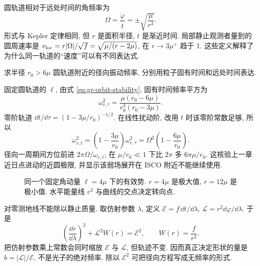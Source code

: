 圆轨道相对于远处时间的角频率为
\begin{equation}
 \Omega=\frac{\dot\varphi}{\dot t}
       =\pm\sqrt{\frac\mu{r^3}}.
 \label{eq:gr-schwarzschild-omega}
\end{equation}
形式与 Kepler 定律相同, 但 $r$ 是面积半径, $t$ 是渐近时间. 局部静止观测者量到的圆周速率是 $v_{\rm loc}=r|\Omega|/\sqrt f=\sqrt{\mu/(r-2\mu)}$, 在 $r\to3\mu^+$ 趋于 1. 这些定义解释了为什么同一轨道的“速度”可以有不同表达式.

\begin{example}
 求半径 $r_0>6\mu$ 圆轨道附近的径向振动频率, 分别用粒子固有时间和远处时间表达.
\end{example}
\begin{solution}
 固定圆轨道的 $\ell$, 由式 \eqref{eq:gr-orbit-stability}, 固有时间频率平方为
 \[
 \omega_{r,\tau}^2=\frac{\mu(r_0-6\mu)}{r_0^3(r_0-3\mu)}.
 \]
 零阶轨道 $\dd t/\dd\tau=(1-3\mu/r_0)^{-1/2}$. 在线性扰动阶, 改用 $t$ 时该零阶常数足够, 所以
 \[
 \omega_{r,t}^2=\left(1-\frac{3\mu}{r_0}\right)\omega_{r,\tau}^2
       =\Omega^2\left(1-\frac{6\mu}{r_0}\right).
 \]
 径向一周期间方位前进 $2\pi\Omega/\omega_{r,t}$; 在 $\mu/r_0\ll1$ 下比 $2\pi$ 多 $6\pi\mu/r_0$. 这核验上一章近日点进动的近圆极限, 并显示该弱场展开在 ISCO 附近不能继续使用.
\end{solution}

\begin{figure}[htbp]
\centering
\vspace*{9mm}
\caption{同一个固定角动量 $\ell=4\mu$ 下的有效势. $r=4\mu$ 是极大值, $r=12\mu$ 是极小值. 水平能量线 $\varepsilon^2$ 与曲线的交点决定转向点.}
\label{fig:gr-effective-potential}
\end{figure}


对零测地线不能除以静止质量. 取仿射参数 $\lambda$, 定义 $\mathcal E=f\,\dd t/\dd\lambda$, $\mathcal L=r^2\dd\varphi/\dd\lambda$. 于是
\begin{equation}
 \left(\frac{\dd r}{\dd\lambda}\right)^2
       +\mathcal L^2 W(r)=\mathcal E^2,\qquad
 W(r)=\frac f{r^2}.
 \label{eq:gr-null-potential}
\end{equation}
把仿射参数乘上常数会同时缩放 $\mathcal E$ 与 $\mathcal L$, 但轨迹不变. 因而真正决定形状的量是 $b=|\mathcal L|/\mathcal E$, 不是光子的绝对频率. 除以 $\mathcal E^2$ 可把径向方程写成无频率的形式.

